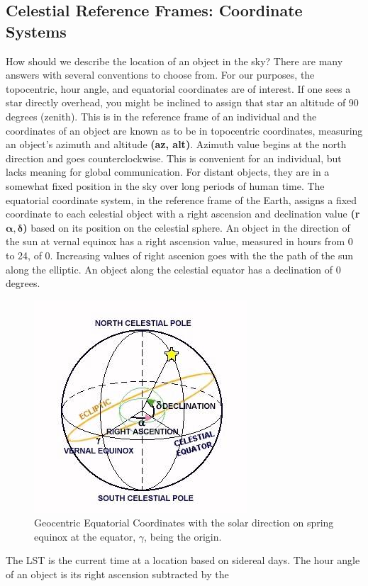\documentclass{article}
\begin{document}
\subsection{Celestial Reference Frames: Coordinate Systems}
How should we describe the location of an object in the sky? There are
many answers with several conventions to choose from. For our purposes,
the topocentric, hour angle, and equatorial coordinates are of
interest. If one sees a star directly overhead, you might be inclined to 
assign that star an altitude of 90 degrees (zenith). This is in the
reference frame of an individual and the coordinates of an object are
known as to be in topocentric coordinates, measuring an object's azimuth
and altitude \textbf{(az, alt)}. Azimuth value begins at the north
direction and goes counterclockwise. This is convenient for an
individual, but lacks meaning for global communication. For distant
objects, they are in a somewhat fixed position in the sky over long
periods of human time. The equatorial coordinate system, in the
reference frame of the Earth, assigns a fixed coordinate to each
celestial object with a right ascension and declination value 
\textbf{(r$\boldsymbol\alpha, \boldsymbol\delta$)} based on its position
on the celestial sphere. An object in the direction of the sun at vernal
equinox has a right ascension value, measured in hours from 0 to 24, of
0. Increasing values of right ascenion goes with the the path of the sun 
along the elliptic. An object along the celestial equator has a
declination of 0 degrees. 
\begin{figure}[!h]
\centering
\includegraphics[width=.5\textwidth]{coordinates_equatorial.png}
\caption{Geocentric Equatorial Coordinates with the solar direction on
  spring equinox at the equator, $\gamma$, being the origin.}
\end{figure}
The LST is the current time at a location based on sidereal days. The
hour angle of an object is its right ascension subtracted by the
\end{document}
